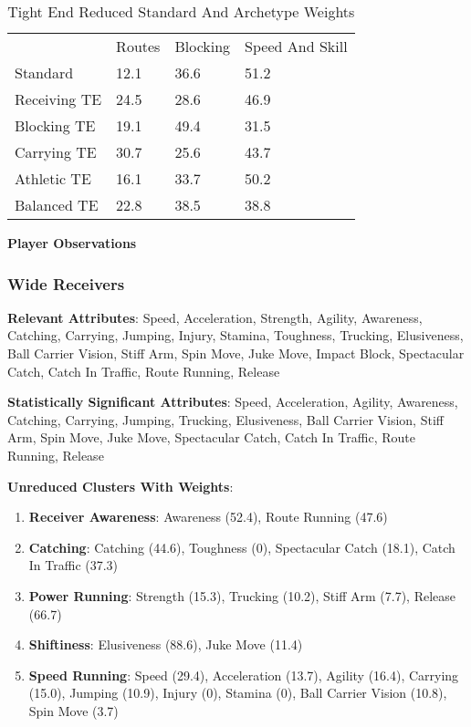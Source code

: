 \documentclass[11pt]{article}
\begin{document}
\begin{table}[]
\centering
\caption{Tight End Reduced Standard And Archetype Weights}
\label{TightEndReducedWeights}
\begin{tabular}{llll}
             & Routes & Blocking & Speed And Skill \\
Standard     & 12.1   & 36.6     & 51.2            \\
Receiving TE & 24.5   & 28.6     & 46.9            \\
Blocking TE  & 19.1   & 49.4     & 31.5            \\
Carrying TE  & 30.7   & 25.6     & 43.7            \\
Athletic TE  & 16.1   & 33.7     & 50.2            \\
Balanced TE  & 22.8   & 38.5     & 38.8           
\end{tabular}
\end{table}

\textbf{Player Observations}

\subsubsection{Wide Receivers}

\textbf{Relevant Attributes}: Speed, Acceleration, Strength, Agility, Awareness, Catching, Carrying, Jumping, Injury, Stamina, Toughness, Trucking, Elusiveness, Ball Carrier Vision, Stiff Arm, Spin Move, Juke Move, Impact Block, Spectacular Catch, Catch In Traffic, Route Running, Release

\textbf{Statistically Significant Attributes}: Speed, Acceleration, Agility, Awareness, Catching, Carrying, Jumping, Trucking, Elusiveness, Ball Carrier Vision, Stiff Arm, Spin Move, Juke Move, Spectacular Catch, Catch In Traffic, Route Running, Release

\textbf{Unreduced Clusters With Weights}:

\begin{enumerate}
\item{\textbf{Receiver Awareness}}: Awareness (52.4), Route Running (47.6)
\item{\textbf{Catching}}: Catching (44.6), Toughness (0), Spectacular Catch (18.1), Catch In Traffic (37.3)
\item{\textbf{Power Running}}: Strength (15.3), Trucking (10.2), Stiff Arm (7.7), Release (66.7)
\item{\textbf{Shiftiness}}: Elusiveness (88.6), Juke Move (11.4)
\item{\textbf{Speed Running}}: Speed (29.4), Acceleration (13.7), Agility (16.4), Carrying (15.0), Jumping (10.9), Injury (0), Stamina (0), Ball Carrier Vision (10.8), Spin Move (3.7)
\end{enumerate}
\end{document}
